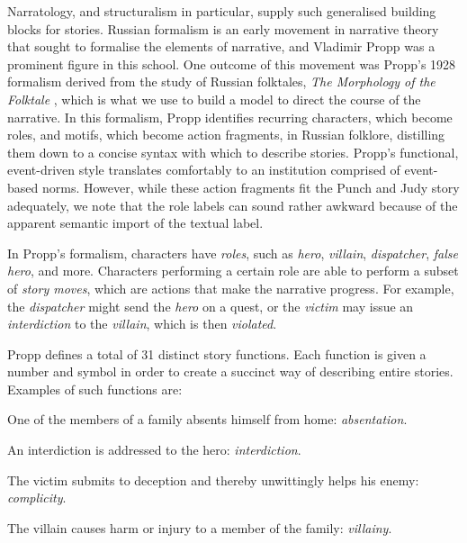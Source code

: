 \documentclass{llncs}
\begin{document}
Narratology, and structuralism in particular, supply such generalised building blocks for stories. Russian formalism is an early movement in narrative theory that sought to formalise the elements of narrative, and Vladimir Propp was a prominent figure in this school.  One outcome of this movement was Propp's 1928 formalism derived from the study of Russian folktales, \emph{The Morphology of the Folktale} \cite{propp1968morphology}, which is what we use to build a model to direct the course of the narrative.  In this formalism, Propp identifies recurring characters, which become roles, and motifs, which become action fragments, in Russian folklore, distilling them down to a concise syntax with which to describe stories. Propp's functional, event-driven style translates comfortably to an institution comprised of event-based norms. However, while these action fragments fit the Punch and Judy story adequately, we note that the role labels can sound rather awkward because of the apparent semantic import of the textual label.

In Propp's formalism, characters have \emph{roles}, such as \emph{hero}, \emph{villain}, \emph{dispatcher}, \emph{false hero}, and more. Characters performing a certain role are able to perform a subset of \emph{story moves}, which are actions that make the narrative progress. For example, the \emph{dispatcher} might send the \emph{hero} on a quest, or the \emph{victim} may issue an \emph{interdiction} to the \emph{villain}, which is then \emph{violated}.

Propp defines a total of 31 distinct story functions. Each function is given a number and symbol in order to create a succinct way of describing entire stories. Examples of such functions are:

\begin{compactitem}
  \item One of the members of a family absents himself from home: \emph{absentation}.
  \item An interdiction is addressed to the hero: \emph{interdiction}.
  \item The victim submits to deception and thereby unwittingly helps his enemy: \emph{complicity}.
  \item The villain causes harm or injury to a member of the family: \emph{villainy}.
\end{compactitem}
\end{document}
